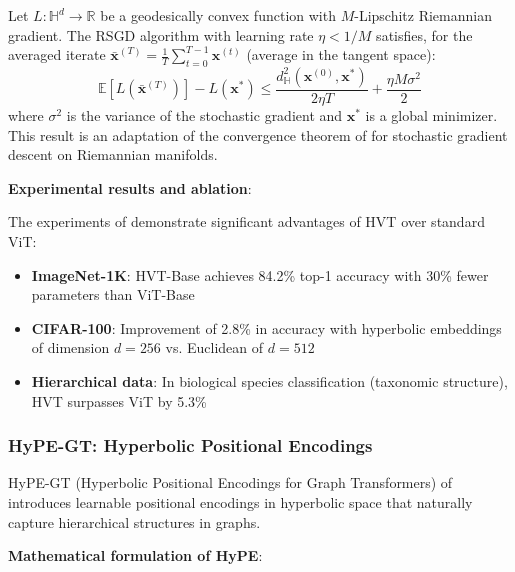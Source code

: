 \begin{theorem}\label{thm:hvt_convergence}
Let $L: \mathbb{H}^d \to \mathbb{R}$ be a geodesically convex function with $M$-Lipschitz Riemannian gradient. The RSGD algorithm with learning rate $\eta < 1/M$ satisfies, for the averaged iterate $\bar{\mathbf{x}}^{(T)} = \frac{1}{T}\sum_{t=0}^{T-1} \mathbf{x}^{(t)}$ (average in the tangent space):
\begin{equation}
\mathbb{E}[L(\bar{\mathbf{x}}^{(T)})] - L(\mathbf{x}^*) \leq \frac{d_{\mathbb{H}}^2(\mathbf{x}^{(0)}, \mathbf{x}^*)}{2\eta T} + \frac{\eta M \sigma^2}{2}
\end{equation}
where $\sigma^2$ is the variance of the stochastic gradient and $\mathbf{x}^*$ is a global minimizer. This result is an adaptation of the convergence theorem of \citet{bonnabel2013stochastic} for stochastic gradient descent on Riemannian manifolds.
\end{theorem}

\textbf{Experimental results and ablation}:

The experiments of \citet{hvt2024hyperbolic} demonstrate significant advantages of HVT over standard \gls{ViT}:

\begin{itemize}
    \item \textbf{ImageNet-1K}: HVT-Base achieves 84.2\% top-1 accuracy with 30\% fewer parameters than ViT-Base
    \item \textbf{CIFAR-100}: Improvement of 2.8\% in accuracy with hyperbolic embeddings of dimension $d=256$ vs. Euclidean of $d=512$
    \item \textbf{Hierarchical data}: In biological species classification (taxonomic structure), HVT surpasses \gls{ViT} by 5.3\%
\end{itemize}

\subsubsection{HyPE-GT: Hyperbolic Positional Encodings}

HyPE-GT (Hyperbolic Positional Encodings for Graph Transformers) of \citet{hypegt2023} introduces learnable positional encodings in hyperbolic space that naturally capture hierarchical structures in graphs.

\textbf{Mathematical formulation of HyPE}:

